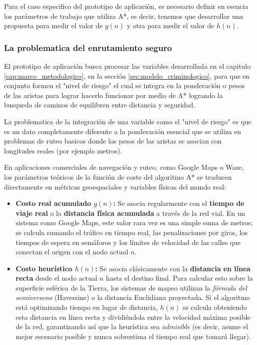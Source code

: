 Para el caso especifico del prototipo de aplicación, es necesario definir en esencia los parámetros de trabajo que utiliza A*, es decir, tenemos que desarrollar una propuesta para medir el valor de $g(n)$ y otra para medir el valor de $h(n)$.

\subsubsection{La problematica del enrutamiento seguro}

El prototipo de aplicación busca procesar las variables desarrollada en el capitulo \ref{cap:marco_metodologico}, en la sección \ref{sec:modelo_criminologico}, para que en conjunto formen el "nivel de riesgo" el cual se integra en la ponderación o pesos de las aristas para lograr hacerlo funcionar por medio de A* logrando la busqueda de caminos de equilibren entre distancia y seguridad. 

La problematica de la integración de una variable como el "nivel de riesgo" es que es un dato completamente diferente a la ponderación esencial que se utiliza en problemas de ruteo basicos donde los pesos de las aristas se asocian con longitudes reales (por ejemplo metros). 

En aplicaciones comerciales de navegación y ruteo, como Google Maps o Waze, los parámetros teóricos de la función de coste del algoritmo A* se traducen directamente en métricas geoespaciales y variables físicas del mundo real:

\begin{itemize}
    \item \textbf{Costo real acumulado $g(n)$:} Se asocia regularmente con el \textbf{tiempo de viaje real} o la \textbf{distancia física acumulada} a través de la red vial. En un sistema como Google Maps, este valor rara vez es una simple suma de metros; se calcula sumando el tráfico en tiempo real, las penalizaciones por giros, los tiempos de espera en semáforos y los límites de velocidad de las calles que conectan el origen con el nodo actual $n$.
    
    \item \textbf{Costo heurístico $h(n)$:} Se asocia clásicamente con la \textbf{distancia en línea recta} desde el nodo actual $n$ hasta el destino final. Para calcular esto sobre la superficie esférica de la Tierra, los sistemas de mapeo utilizan la \textit{fórmula del semiverseno} (Haversine) o la distancia Euclidiana proyectada. Si el algoritmo está optimizando tiempo en lugar de distancia, $h(n)$ se calcula obteniendo esta distancia en línea recta y dividiéndola entre la velocidad máxima posible de la red, garantizando así que la heurística sea \textit{admisible} (es decir, asume el mejor escenario posible y nunca sobrestima el tiempo real que tomará llegar).
\end{itemize}

